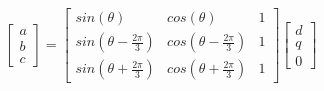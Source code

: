 \begin{gather}
\label{eq:inv_park}
    \begin{bmatrix}
    a \\ b \\ c
    \end{bmatrix}
    =
    \begin{bmatrix}
    sin(\theta)                & cos(\theta)                & 1                   \\[0.5em]
    sin(\theta-\frac{2\pi}{3}) & cos(\theta-\frac{2\pi}{3}) & 1                   \\[0.5em]
    sin(\theta+\frac{2\pi}{3}) & cos(\theta+\frac{2\pi}{3}) & 1
    \end{bmatrix}
    \begin{bmatrix}
    d\\ q \\ 0
    \end{bmatrix}
\end{gather}


